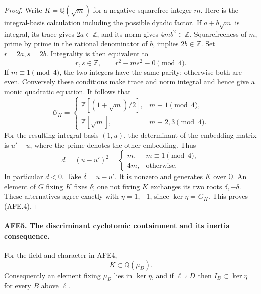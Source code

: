 \documentclass[11pt,a4paper]{article}
\numberwithin{equation}{section}
\theoremstyle{remark}\newtheorem{remark}[theorem]{Remark}
\begin{document}
\begin{proof}
Write \(K=\mathbb Q(\sqrt m)\) for a negative squarefree
integer \(m\).  Here is the integral-basis calculation
including the possible dyadic factor.
If \(a+b\sqrt m\) is integral, its trace gives
\(2a\in\mathbb Z\), and its norm gives
\(4mb^2\in\mathbb Z\).
Squarefreeness of \(m\), prime by prime in the rational
denominator of \(b\), implies \(2b\in\mathbb Z\).
Set \(r=2a,s=2b\).  Integrality is then equivalent to
\[
                  r,s\in\mathbb Z,\qquad
                  r^2-ms^2\equiv0\pmod4.
\]
If \(m\equiv1\pmod4\), the two integers have the same
parity; otherwise both are even.  Conversely these
conditions make trace and norm integral and hence give
a monic quadratic equation.  It follows that
\[
 \mathcal O_K=
 \begin{cases}
  \mathbb Z[(1+\sqrt m)/2],&m\equiv1\pmod4,\\
  \mathbb Z[\sqrt m],&m\equiv2,3\pmod4.
 \end{cases}
\]
For the resulting integral basis \((1,u)\), the determinant
of the embedding matrix is \(u'-u\), where the prime denotes
the other embedding.  Thus
\[
        d=(u-u')^2=
        \begin{cases}m,&m\equiv1\pmod4,\\4m,&\text{otherwise}.
        \end{cases}
\]
In particular \(d<0\).  Take \(\delta=u-u'\).
It is nonzero and generates \(K\) over \(\mathbb Q\).
An element of \(G\) fixing \(K\) fixes \(\delta\);
one not fixing \(K\) exchanges its two roots
\(\delta,-\delta\).
These alternatives agree exactly with
\(\eta=1,-1\), since \(\ker\eta=G_K\).
This proves (AFE.4).
\end{proof}

\paragraph{AFE5. The discriminant cyclotomic containment and its inertia consequence.}
\label{claim:AFE5}
For the field and character in AFE4,
\[
                  K\subset\mathbb Q(\mu_D).
                                                        \tag{AFE.5}
\]
Consequently an element fixing \(\mu_D\) lies in
\(\ker\eta\), and if \(\ell\nmid D\) then
\(I_B\subset\ker\eta\) for every \(B\) above \(\ell\).
\end{document}
